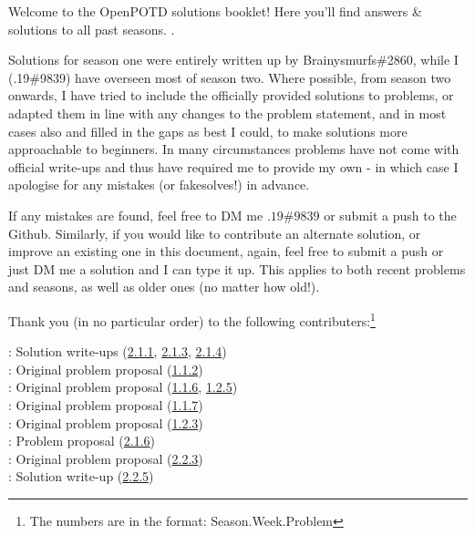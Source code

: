 Welcome to the OpenPOTD solutions booklet! Here you'll find answers \& solutions to all past seasons.\medskip
.

Solutions for season one were entirely written up by Brainysmurfs\#2860, while I (.19\#9839) have overseen most of season two. 
Where possible, from season two onwards, I have tried to include the officially provided solutions to problems, or adapted them in line with any changes to the problem statement, and in most cases also and filled in the gaps as best I could, to make solutions more approachable to beginners. 
In many circumstances problems have not come with official write-ups and thus have required me to provide my own - in which case I apologise for any mistakes (or fakesolves!) in advance.\medskip

If any mistakes are found, feel free to DM me \(.19\#9839\) or submit a push to the Github.
Similarly, if you would like to contribute an alternate solution, or improve an existing one in this document, again, feel free to submit a push or just DM me a solution and I can type it up. 
This applies to both recent problems and seasons, as well as older ones (no matter how old!).\bigskip 


Thank you (in no particular order) to the following contributers:\footnote{The numbers are in the format: Season.Week.Problem}\medskip

\Paiya: Solution write-ups (\hyperref[2-1-1]{2.1.1}, \hyperref[2-1-3]{2.1.3}, \hyperref[2-1-4]{2.1.4})\\
\Ptony: Original problem proposal (\hyperref[1-1-2]{1.1.2})\\
\Ppi: Original problem proposal (\hyperref[1-1-6]{1.1.6}, \hyperref[1-2-5]{1.2.5})\\
\Pbfan: Original problem proposal (\hyperref[1-1-7]{1.1.7})\\
\Pkiesh: Original problem proposal (\hyperref[1-2-3]{1.2.3})\\
\Pchris: Problem proposal (\hyperref[2-1-6]{2.1.6})\\
\Pkee: Original problem proposal (\hyperref[2-2-3]{2.2.3})\\
\PSlas: Solution write-up (\hyperref[2-2-5]{2.2.5})
\medskip
